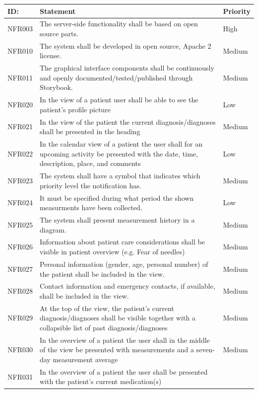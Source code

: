 \documentclass{scrreprt}
\begin{document}
\begin{center}
\begin{tabularx}{\linewidth}{| l | X | l |}
\hline
\textbf{ID:} & \textbf{Statement} & \textbf{Priority} \\
\hline
NFR003 & 
The server-side functionality shall be based on open source parts. &
High \\ 
\hline
NFR010 & 
The system shall be developed in open source, Apache 2 license. &
Medium \\ 
\hline
NFR011 & 
The graphical interface components shall be continuously and openly documented/tested/published through Storybook. &
Medium \\ 
\hline
NFR020 & 
In the view of a patient user shall be able to see the patient's profile picture &
Low \\ 
\hline
NFR021 & 
In the view of the patient the current diagnosis/diagnoses shall be presented in the heading  &
Medium \\ 
\hline
NFR022 & 
In the calendar view of a patient the user shall for an upcoming activity be presented with the date, time, description, place, and comments &
Low \\ 
\hline
NFR023 & 
The system shall have a symbol that indicates which priority level the notification has. &
Medium \\ 
\hline
NFR024 & 
It must be specified during what period the shown measurments have been collected. &
Low \\ 
\hline
NFR025 & 
The system shall present measurement history in a diagram. &
Medium \\ 
\hline
NFR026 & 
Information about patient care considerations shall be visible in patient overview (e.g. Fear of needles)  &
Medium \\ 
\hline
NFR027 & 
Personal information (gender, age, personal number) of the patient shall be included in the view. &
Medium \\ 
\hline
NFR028 & 
Contact information and emergency contacts, if available, shall be included in the view. &
Medium \\ 
\hline
NFR029 & 
At the top of the view, the patient's current diagnosis/diagnoses shall be visible together with a collapsible list of past diagnosis/diagnoses &
Medium \\ 
\hline
NFR030 & 
In the overview of a patient the user shall in the middle of the view be presented with measurements and a seven-day measurement average &
Medium \\ 
\hline
NFR031 & 
In the overview of a patient the user shall be presented with the patient’s current medication(s) &

\end{tabularx}
\end{center}
\end{document}
